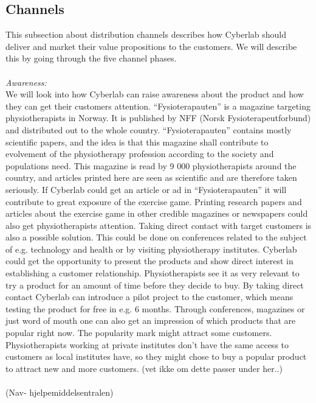 \subsection{Channels}
This subsection about distribution channels describes how Cyberlab should deliver and market their value propositions to the customers. We will describe this by going through the five channel phases.\\ \\
\emph{Awareness:} \\ 
We will look into how Cyberlab can raise awareness about the product and how they can get their customers attention.  “Fysioterapauten” is a magazine targeting physiotherapists in Norway. It is published by NFF (Norsk Fysioterapeutforbund) and distributed out to the whole country. “Fysioterapauten” contains mostly scientific papers, and the idea is that this magazine shall contribute to evolvement of the physiotherapy profession according to the society and populations need. This magazine is read by 9 000 physiotherapists around the country, and articles printed here are seen as scientific and are therefore taken seriously.  If Cyberlab could get an article or ad in “Fysioterapauten” it will contribute to great exposure of the exercise game.  Printing research papers and articles about the exercise game in other credible magazines or newspapers could also get physiotherapists attention.  Taking direct contact with target customers is also a possible solution. This could be done on conferences related to the subject of e.g. technology and health or by visiting physiotherapy institutes. Cyberlab could get the opportunity to present the products and show direct interest in establishing a customer relationship. Physiotherapists see it as very relevant to try a product for an amount of time before they decide to buy. By taking direct contact Cyberlab can introduce a pilot project to the customer, which means testing the product for free in e.g. 6 months. Through conferences, magazines or just word of mouth one can also get an impression of which products that are popular right now. The popularity mark might attract some customers. Physiotherapists working at private institutes don’t have the same access to customers as local institutes have, so they might chose to buy a popular product to attract new and more customers. (vet ikke om dette passer under her..)\\ \\ 
 (Nav- hjelpemiddelsentralen)\\ \\
